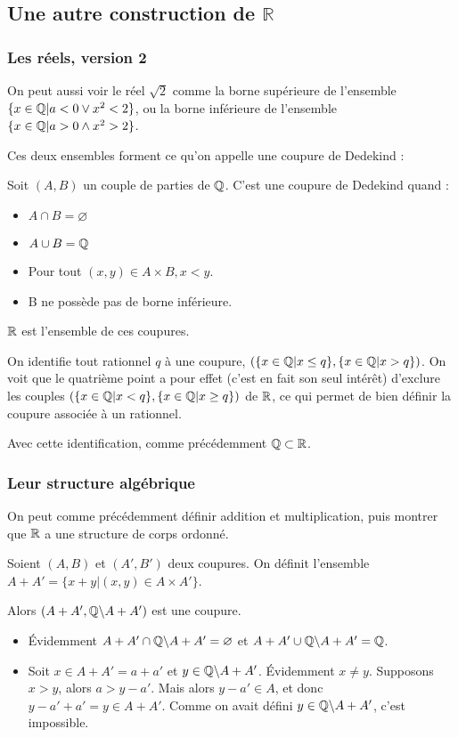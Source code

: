 \subsection{Une autre construction de $\mathbb{R}$}
\subsubsection{Les réels, version 2}

On peut aussi voir le réel $\sqrt{2}$ comme la borne supérieure de l'ensemble $\{x\in \mathbb{Q} | a<0 \lor x^2<2\}$, ou la borne inférieure de l'ensemble $\{x\in \mathbb{Q} | a>0 \land x^2>2\}$.

Ces deux ensembles forment ce qu'on appelle une coupure de Dedekind :
\begin{defini}
    Soit $(A, B)$ un couple de parties de $\mathbb{Q}$. C'est une coupure de Dedekind quand :
    \begin{itemize}
        \item $A\cap B = \varnothing$
        \item $A\cup B = \mathbb{Q}$
        \item Pour tout $(x,y) \in A\times B, x<y$.
        \item B ne possède pas de borne inférieure. 
    \end{itemize}
\end{defini}

$\mathbb{R}$ est l'ensemble de ces coupures.

On identifie tout rationnel $q$ à une coupure, $(\{x\in \mathbb{Q} | x \leq q\}, \{x\in \mathbb{Q} | x > q\})$. On voit que le quatrième point a pour effet (c'est en fait son seul intérêt) d'exclure les couples $(\{x\in \mathbb{Q} | x < q\}, \{x\in \mathbb{Q} | x  \geq q\})$ de $\mathbb{R}$, ce qui permet de bien définir la coupure associée à un rationnel.

Avec cette identification, comme précédemment $\mathbb{Q} \subset \mathbb{R}$.

\subsubsection{Leur structure algébrique}

On peut comme précédemment définir addition et multiplication, puis montrer que $\mathbb{R}$ a une structure de corps ordonné.

\begin{defini}[Addition]
    Soient $(A, B)$ et $(A', B')$ deux coupures. On définit l'ensemble $A+A'=\{x+y | (x,y) \in A \times A'\}$.
    
    Alors $(A+A', \mathbb{Q}\backslash A+A')$ est une coupure.
    \tcblower
    \begin{itemize}
        \item Évidemment $A+A'\cap \mathbb{Q}\backslash A+A'=\varnothing$ et $A+A'\cup \mathbb{Q}\backslash A+A'=\mathbb{Q}$.
        \item Soit $x\in A+A'=a+a'$ et $y\in\mathbb{Q}\backslash A+A'$. Évidemment $x\neq y$. Supposons $x>y$, alors $a>y-a'$. Mais alors $y-a' \in A$, et donc $y-a'+a'=y\in A+A'$. Comme on avait défini $y\in\mathbb{Q}\backslash A+A'$, c'est impossible.
    \end{itemize}
\end{defini}

